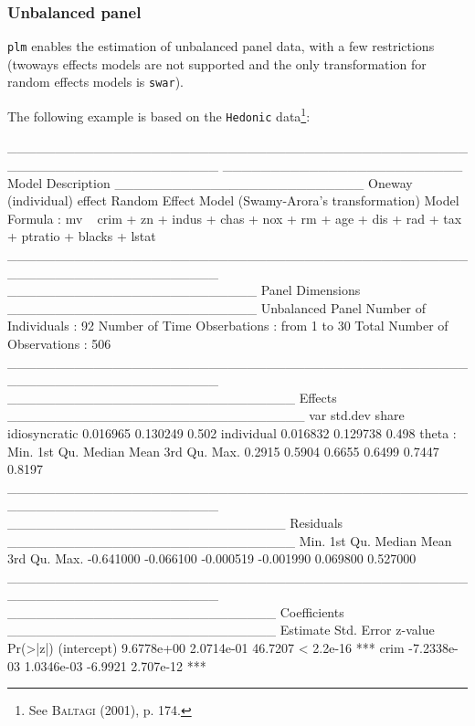 \documentclass{article}
\begin{document}
\subsubsection{Unbalanced panel}

\texttt{plm} enables the estimation of unbalanced panel data, with a
few restrictions (twoways effects models are not supported and the
only transformation for random effects models is \texttt{swar}).

The
following example is based on the \texttt{Hedonic} data\footnote{See \textsc{Baltagi}
  (2001), p. 174.}:

\begin{Schunk}
\begin{Soutput}
______________________________________________________________________ 
_________________________ Model Description __________________________
Oneway (individual) effect
Random Effect Model (Swamy-Arora's transformation)
Model Formula            : mv ~ crim + zn + indus + chas + nox + 
                               rm + age + dis + rad + tax + ptratio + 
                               blacks + lstat
______________________________________________________________________ 
__________________________ Panel Dimensions __________________________
Unbalanced Panel
Number of Individuals        :  92
Number of Time Obserbations  :  from 1 to 30
Total Number of Observations :  506
______________________________________________________________________ 
______________________________ Effects _______________________________
                   var  std.dev share
idiosyncratic 0.016965 0.130249 0.502
individual    0.016832 0.129738 0.498
theta  : 
   Min. 1st Qu.  Median    Mean 3rd Qu.    Max. 
 0.2915  0.5904  0.6655  0.6499  0.7447  0.8197 
______________________________________________________________________ 
_____________________________ Residuals ______________________________
     Min.   1st Qu.    Median      Mean   3rd Qu.      Max. 
-0.641000 -0.066100 -0.000519 -0.001990  0.069800  0.527000 
______________________________________________________________________ 
____________________________ Coefficients ____________________________
               Estimate  Std. Error  z-value  Pr(>|z|)    
(intercept)  9.6778e+00  2.0714e-01  46.7207 < 2.2e-16 ***
crim        -7.2338e-03  1.0346e-03  -6.9921 2.707e-12 ***

\end{Soutput}
\end{Schunk}
\end{document}
